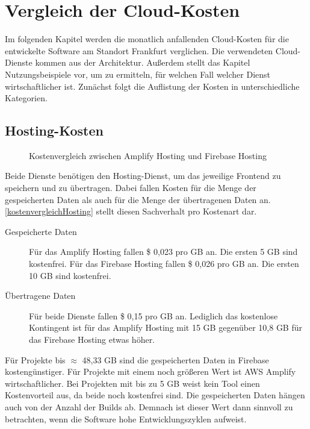 \chapter{Vergleich der Cloud-Kosten}

Im folgenden Kapitel werden die monatlich anfallenden Cloud-Kosten \autocite{awsPricing} \autocite{gcpPricing} für die entwickelte Software am Standort Frankfurt verglichen. Die verwendeten Cloud-Dienste kommen aus der Architektur. Außerdem stellt das Kapitel Nutzungsbeispiele vor, um zu ermitteln, für welchen Fall welcher Dienst wirtschaftlicher ist. Zunächst folgt die Auflistung der Kosten in unterschiedliche Kategorien.

\section{Hosting-Kosten}

\begin{figure}%
    \centering
    \qquad
    \caption{Kostenvergleich zwischen Amplify Hosting und Firebase Hosting}%
    \label{kostenvergleichHosting}%
\end{figure}

Beide Dienste benötigen den Hosting-Dienst, um das jeweilige Frontend zu speichern und zu übertragen. Dabei fallen Kosten für die Menge der gespeicherten Daten als auch für die Menge der übertragenen Daten an. \autoref{kostenvergleichHosting} stellt diesen Sachverhalt pro Kostenart dar.

\begin{description}
  \item[Gespeicherte Daten] Für das Amplify Hosting fallen \$ 0,023 pro GB an. Die ersten 5 GB sind kostenfrei. Für das Firebase Hosting fallen \$ 0,026 pro GB an. Die ersten 10 GB sind kostenfrei.
  \item[Übertragene Daten] Für beide Dienste fallen \$ 0,15 pro GB an. Lediglich das kostenlose Kontingent ist für das Amplify Hosting mit 15 GB gegenüber 10,8 GB für das Firebase Hosting etwas höher.
\end{description}

Für Projekte bis $\approx$ 48,33 GB sind die gespeicherten Daten in Firebase kostengünstiger. Für Projekte mit einem noch größeren Wert ist \ac{AWS} Amplify wirtschaftlicher. Bei Projekten mit bis zu 5 GB weist kein Tool einen Kostenvorteil aus, da beide noch kostenfrei sind. Die gespeicherten Daten hängen auch von der Anzahl der Builds ab. Demnach ist dieser Wert dann sinnvoll zu betrachten, wenn die Software hohe Entwicklungszyklen aufweist.

